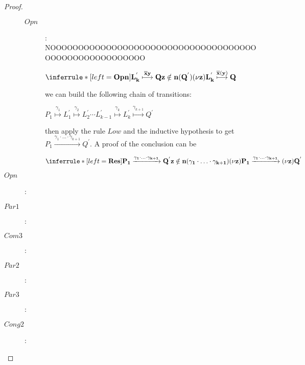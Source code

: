 \begin{proposition}
\begin{proof}
\begin{description}
\begin{description}
		  \item[$Opn$]: NOOOOOOOOOOOOOOOOOOOOOOOOOOOOOOOOOOOOOOOOOOOOOOOOOOOOOOO
		    \begin{center}
		      $\inferrule* [left=\bf{Opn}]{
			  L_{k}^{'} \stackrel{\overline{x}y}{\longmapsto} Q
			\\
			  z\notin n(Q^{'})
		      }{
			(\nu z)L_{k}^{'} \stackrel{\overline{x}(y)}{\longmapsto} Q
		      }$
		    \end{center}
		    we can build the following chain of transitions:
		    \begin{center}
		      $P_{1} \stackrel{\gamma_{1}}{\longmapsto} L_{1}^{'} \stackrel{\gamma_{2}}{\longmapsto} L_{2}^{'} \cdots L_{k-1}^{'} \stackrel{\gamma_{k}}{\longmapsto} L_{k}^{'}\stackrel{\gamma_{k+1}}{\longmapsto} Q^{'}$ 
		    \end{center}
		    then apply the rule $Low$ and the inductive hypothesis to get $P_{1} \xrightarrow{\gamma_{1}\cdot \ldots \cdot \gamma_{k+1}} Q^{'}$. A proof of the conclusion can be
		    \begin{center}
		      $\inferrule* [left=\bf{Res}]{
			  P_{1} \xrightarrow{\gamma_{1}\cdot \ldots \cdot \gamma_{k+1}} Q^{'}
			\\
			  z\notin n(\gamma_{1}\cdot \ldots \cdot \gamma_{k+1})
		      }{
			(\nu z)P_{1} \xrightarrow{\gamma_{1}\cdot \ldots \cdot \gamma_{k+1}} (\nu z)Q^{'}
		    }$
		    \end{center}
		\end{description}
	      \item[$Opn$]: 
		
	      \item[$Par1$]: 
		
	      \item[$Com3$]: 
		
	      \item[$Par2$]: 
		
	      \item[$Par3$]: 
		
	      \item[$Cong2$]: 
		
	    \end{description}	    
  \end{proof}
\end{proposition}





